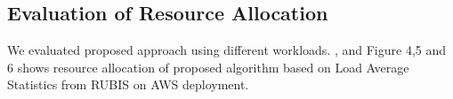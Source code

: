 \subsection{Evaluation of Resource Allocation}
We evaluated proposed approach using different workloads. \label{stratos} ,  and \label{proactive} Figure 4,5 and 6 shows resource allocation of proposed algorithm based on Load Average Statistics from RUBIS on AWS deployment.

